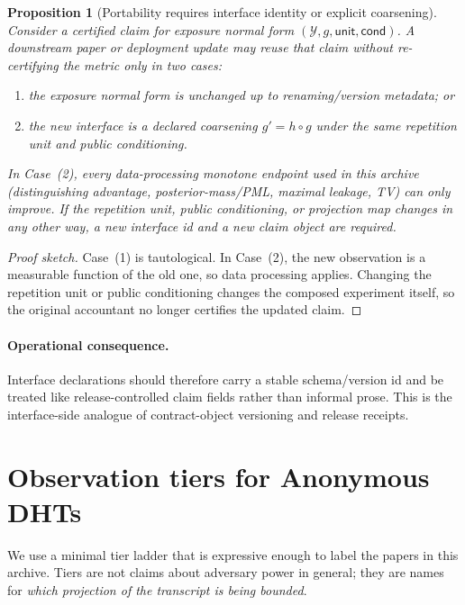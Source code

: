 \documentclass[11pt]{article}
\newtheorem{proposition}{Proposition}
\begin{document}
\begin{proposition}[Portability requires interface identity or explicit coarsening]
\label{prop:interface-portability}
Consider a certified claim for exposure normal form $(\mathcal Y,g,\mathsf{unit},\mathsf{cond})$.
A downstream paper or deployment update may reuse that claim without re-certifying the metric only in two cases:
\begin{enumerate}[leftmargin=*]
\item the exposure normal form is unchanged up to renaming/version metadata; or
\item the new interface is a declared coarsening $g' = h\circ g$ under the same repetition unit and public conditioning.
\end{enumerate}
In Case~(2), every data-processing monotone endpoint used in this archive (distinguishing advantage, posterior-mass/PML, maximal leakage, TV) can only improve.
If the repetition unit, public conditioning, or projection map changes in any other way, a new interface id and a new claim object are required.
\end{proposition}

\begin{proof}[Proof sketch]
Case~(1) is tautological.
In Case~(2), the new observation is a measurable function of the old one, so data processing applies.
Changing the repetition unit or public conditioning changes the composed experiment itself, so the original accountant no longer certifies the updated claim.
\end{proof}

\paragraph{Operational consequence.}
Interface declarations should therefore carry a stable schema/version id and be treated like release-controlled claim fields rather than informal prose.
This is the interface-side analogue of contract-object versioning and release receipts.\cite{series:contractobjects,series:releaseproperty}

\section{Observation tiers for Anonymous DHTs}\label{sec:tiers}
We use a minimal tier ladder that is expressive enough to label the papers in this archive.
Tiers are not claims about adversary power in general; they are names for \emph{which projection of the transcript is being bounded}.
\end{document}
